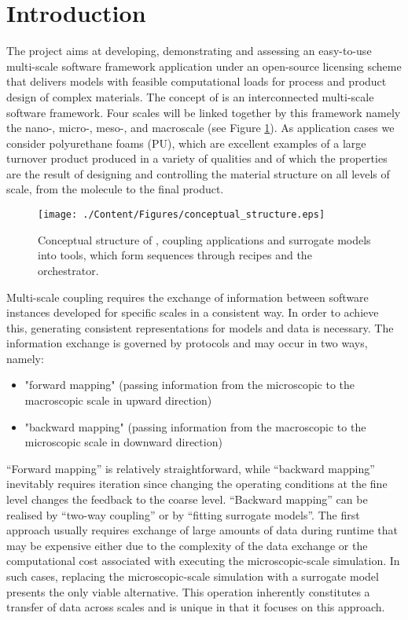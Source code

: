 \section{Introduction}
%
The {\MoDeNa} project aims at developing, demonstrating and assessing an
easy-to-use multi-scale software framework application under an open-source
licensing scheme that delivers models with feasible computational loads for
process and product design of complex materials. The concept of {\MoDeNa} is an
interconnected multi-scale software framework. Four scales will be linked
together by this framework namely the nano-, micro-, meso-, and macroscale (see
Figure \ref{fig:ConceptualStructure}).  As application cases we consider
polyurethane foams (PU), which are excellent examples of a large turnover
product produced in a variety of qualities and of which the properties are the
result of designing and controlling the material structure on all levels of
scale, from the molecule to the final product.

\begin{figure}
\centering
\texttt{[image: ./Content/Figures/conceptual\_structure.eps]}
\caption{Conceptual structure of {\MoDeNa}, coupling applications and surrogate
  models into tools, which form sequences through recipes and the orchestrator.}
\label{fig:ConceptualStructure}
\end{figure}

Multi-scale coupling requires the exchange of information between software
instances developed for specific scales in a consistent way. In order to achieve
this, generating consistent representations for models and data is necessary.
The information exchange is governed by protocols and may occur in two ways,
namely:
\begin{itemize}
\item "forward mapping" (passing information from the microscopic to the
  macroscopic scale in upward direction)
\item "backward mapping" (passing information from the macroscopic to the
  microscopic scale in downward direction)
\end{itemize}
``Forward mapping'' is relatively straightforward, while ``backward mapping''
inevitably requires iteration since changing the operating conditions at the
fine level changes the feedback to the coarse level.  ``Backward mapping'' can
be realised by ``two-way coupling'' or by ``fitting surrogate models''. The
first approach usually requires exchange of large amounts of data during runtime
that may be expensive either due to the complexity of the data exchange or the
computational cost associated with executing the microscopic-scale simulation.
In such cases, replacing the microscopic-scale simulation with a surrogate model
presents the only viable alternative. This operation inherently constitutes a
transfer of data across scales and {\MoDeNa} is unique in that it focuses on
this approach.

